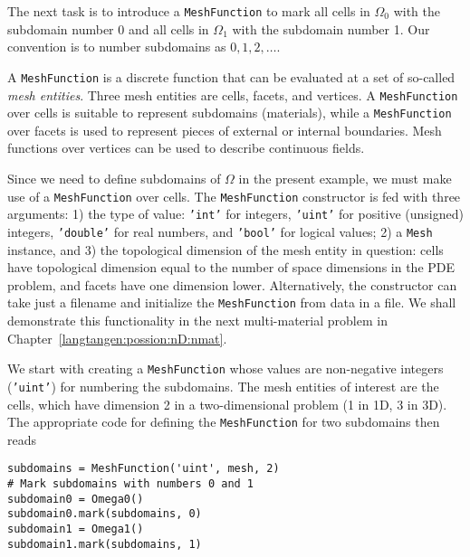 The next task is to introduce a {\fontsize{12pt}{12pt}\texttt{MeshFunction}} to mark all
cells in $\Omega_0$ with the subdomain number 0 and all cells in $\Omega_1$
with the subdomain number 1. 
Our convention is to number subdomains as $0,1,2,\ldots$.

A {\fontsize{12pt}{12pt}\texttt{MeshFunction}} is a discrete function that can be evaluated at a set
of so-called \emph{mesh entities}. Three mesh entities are
cells, facets, and vertices. A {\fontsize{12pt}{12pt}\texttt{MeshFunction}} over cells is suitable to
represent subdomains (materials), while a {\fontsize{12pt}{12pt}\texttt{MeshFunction}} over
facets is used to represent pieces of external or internal boundaries.
Mesh functions over vertices can be used to describe continuous fields.

Since we need to define subdomains of $\Omega$
in the present example, we must make use
of a {\fontsize{12pt}{12pt}\texttt{MeshFunction}} over cells. The 
{\fontsize{12pt}{12pt}\texttt{MeshFunction}} constructor is fed with three arguments: 1) the type
of value: {\fontsize{12pt}{12pt}\texttt{'int'}} for integers, {\fontsize{12pt}{12pt}\texttt{'uint'}} for positive
(unsigned) integers, {\fontsize{12pt}{12pt}\texttt{'double'}} for real numbers, and
{\fontsize{12pt}{12pt}\texttt{'bool'}} for logical values; 2) a {\fontsize{12pt}{12pt}\texttt{Mesh}} instance, and 3)
the topological dimension of the mesh entity in question: cells
have topological dimension equal to the number of space dimensions in
the PDE problem, and facets have one dimension lower.
Alternatively, the constructor can take just a filename
and initialize the {\fontsize{12pt}{12pt}\texttt{MeshFunction}} from data in a file. We shall
demonstrate this functionality in the next multi-material problem
in Chapter~\ref{langtangen:possion:nD:nmat}.

We start with creating a {\fontsize{12pt}{12pt}\texttt{MeshFunction}} whose
values are non-negative integers ({\fontsize{12pt}{12pt}\texttt{'uint'}})
for numbering the subdomains.
The mesh entities of interest are the cells, which have dimension 2
in a two-dimensional problem (1 in 1D, 3 in 3D). The appropriate code for
defining the {\fontsize{12pt}{12pt}\texttt{MeshFunction}} for two subdomains then reads
\begin{Verbatim}[fontsize=\fontsize{10pt}{10pt},tabsize=8,baselinestretch=1.05,
fontfamily=tt,xleftmargin=7mm]
subdomains = MeshFunction('uint', mesh, 2)
# Mark subdomains with numbers 0 and 1
subdomain0 = Omega0()
subdomain0.mark(subdomains, 0)
subdomain1 = Omega1()
subdomain1.mark(subdomains, 1)
\end{Verbatim}
\noindent

